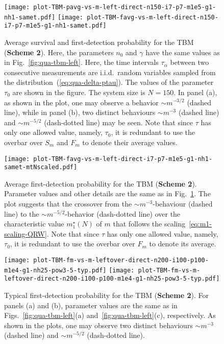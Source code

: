 \documentclass[12pt]{iopart}
\begin{document}
\begin{figure}[!htbp]
\centering
\texttt{[image: plot-TBM-pavg-vs-m-left-direct-n150-i7-p7-m1e5-g1-nh1-samet.pdf]} \hskip5pt 
\texttt{[image: plot-TBM-favg-vs-m-left-direct-n150-i7-p7-m1e5-g1-nh1-samet.pdf]}   
\caption{Average survival and first-detection probability for the TBM (\textbf{Scheme 2}).  Here, the parameters $n_0$ and $\gamma$ have the same values as in Fig.~\ref{fig:qua-tbm-left}.  Here, the time intervals $\tau_\alpha$ between two consecutive
measurements are i.i.d.~random variables sampled from the
        distribution~(\ref{eq:qua-delta-ptau}).  The values of the parameter $\tau_0$ are shown in the figure.  The system size
        is $N=150$.  In panel (a),  as shown in the plot, one may observe a behavior $\sim m^{-3/2}$ (dashed line), while in panel (b),  two distinct behaviours $\sim m^{-3}$ (dashed line) and $\sim m^{-5/2}$ (dash-dotted line) may be seen.  Note that since $\tau$ has only one allowed value, namely, $\tau_0$,  it is redundant to use the overbar over $S_m$ and $F_m$ to denote their average values.}
\label{fig:tbm-samet-sp-fp}
\end{figure}

\begin{figure}[!htbp]
\centering
\texttt{[image: plot-TBM-favg-vs-m-left-direct-i7-p7-m1e5-g1-nh1-samet-mtNscaled.pdf]}   
\caption{Average first-detection probability for the TBM (\textbf{Scheme 2}). Parameter values and other details are the same as in Fig.~\ref{fig:tbm-samet-sp-fp}.  The plot suggests that the crossover from the $\sim m^{-3}$-behaviour (dashed line) to the $\sim m^{-5/2}$-behavior (dash-dotted line) over the characteristic value $m_1^\star(N)$ of $m$ that follows the scaling~\eqref{eq:m1-scaling-QRW}.  Note that since $\tau$ has only one allowed value, namely, $\tau_0$,  it is redundant to use the overbar over $F_m$ to denote its average.}
\label{fig:tbm-fp-scaled}
\end{figure}

\begin{figure}[!htbp]
\centering
\texttt{[image: plot-TBM-fm-vs-m-leftover-direct-n200-i100-p100-m1e4-g1-nh25-pow3-5-typ.pdf]} \hskip5pt 
\texttt{[image: plot-TBM-fm-vs-m-leftover-direct-n200-i100-p100-m1e4-g1-nh25-pow3-5-typ.pdf]}   
\caption{Typical first-detection probability for the TBM (\textbf{Scheme 2}).  For panels (a) and (b), parameter values are the same as in Figs.~\ref{fig:qua-tbm-left}(a) and~\ref{fig:qua-tbm-left}(c), respectively.  As shown in the plots, one may observe two distinct behaviours $\sim m^{-3}$ (dashed line) and $\sim m^{-5/2}$ (dash-dotted line).}
\label{fig:tbm-f-vs-m-exp-pow-typ}
\end{figure}
\end{document}
